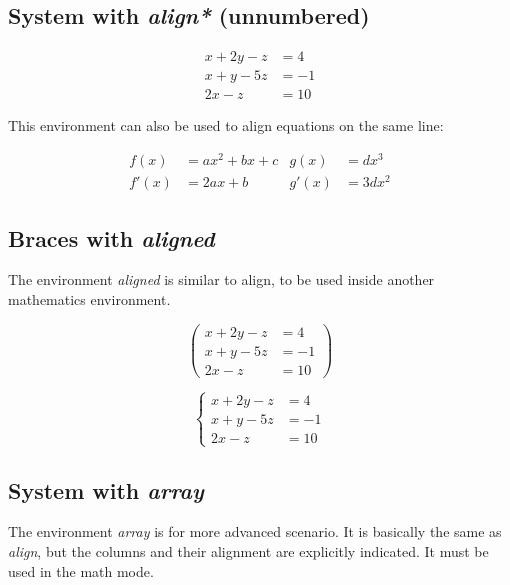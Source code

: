 \documentclass{article}
\begin{document}
\subsection*{System with \emph{align*} (unnumbered)}

\begin{align*}
	x + 2y - z &= 4 \\
	x + y - 5z &= -1 \\
	2x - z &= 10
\end{align*}

This environment can also be used to align equations on the same line:

\begin{align*}
	 f(x)  &= a x^2+b x +c   &   g(x)  &= d x^3 \\
	 f'(x) &= 2 a x +b       &   g'(x) &= 3 d x^2
\end{align*}

\subsection*{Braces with \emph{aligned}}

The environment \emph{aligned} is similar to align, to be used inside another mathematics environment.

\[
\left(
\begin{aligned}
	x + 2y - z &= 4 \\
	x + y - 5z &= -1 \\
	2x - z &= 10
\end{aligned}
\right)
\]

\[
\left\{
\begin{aligned}
x + 2y - z &= 4 \\
x + y - 5z &= -1 \\
2x - z &= 10
\end{aligned}
\right.
\]

\subsection*{System with \emph{array}}

The environment \emph{array} is for more advanced scenario. It is basically the same as \emph{align}, but the columns and their alignment are explicitly indicated. It must be used in the math mode.
\end{document}
